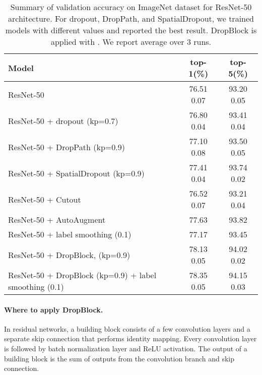 \documentclass{article}
\begin{document}
\begin{table}[h!]
\setlength{\tabcolsep}{8pt}
\begin{center}
\small
\begin{tabular}{>{\footnotesize}l|>{\footnotesize}c>{\footnotesize}c}
\hline
  \footnotesize Model  & \footnotesize top-1(\%) & \footnotesize top-5(\%)\\
\hline \hline
\footnotesize ResNet-50                                         & 76.51   0.07 & 93.20  0.05\\ 
\hline
\footnotesize ResNet-50 + dropout (kp=0.7) \cite{dropout2014}   & 76.80  0.04 & 93.41  0.04 \\ 
\hline
\footnotesize ResNet-50 + DropPath (kp=0.9) \cite{fractalnet2017}          &77.10   0.08 & 93.50  0.05\\
\hline
\footnotesize ResNet-50 + SpatialDropout (kp=0.9) \cite{tompson2015spatialdropout}                & 77.41  0.04 & 93.74  0.02 \\
\hline
\footnotesize ResNet-50 + Cutout \cite{Cutout2017}                               & 76.52   0.07 & 93.21   0.04 \\ 
\hline
\footnotesize ResNet-50 + AutoAugment \cite{cubuk2018autoaugment}                         & 77.63 & 93.82 \\ 
\hline
\footnotesize ResNet-50 + label smoothing (0.1)  \cite{smoothsoftmax2015}                         & 77.17  & 93.45 \\
\hline
\hline
\footnotesize ResNet-50 + DropBlock, (kp=0.9)       & 78.13  0.05 &  94.02  0.02\\
\footnotesize ResNet-50 + DropBlock (kp=0.9) + label smoothing (0.1)     & 78.35  0.05 &  94.15  0.03\\ 
\hline
\end{tabular}
\end{center}
\caption{Summary of validation accuracy on ImageNet dataset for ResNet-50 architecture. For dropout, DropPath, and SpatialDropout, we trained models with different  values and reported the best result. DropBlock is applied with . We report average over 3 runs.}
\label{resnet50}
\end{table}

\paragraph{Where to apply DropBlock.}
In residual networks, a building block consists of a few convolution layers and a separate skip connection that performs identity mapping. Every convolution layer is followed by batch normalization layer and ReLU activation. The output of a building block is the sum of outputs from the convolution branch and skip connection.
\end{document}
